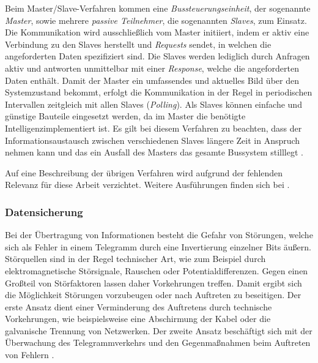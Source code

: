 Beim Master/Slave-Verfahren kommen eine \textit{Bussteuerungseinheit}, der sogenannte \textit{Master}, sowie mehrere \textit{passive Teilnehmer}, die sogenannten \textit{Slaves}, zum Einsatz.
Die Kommunikation wird ausschließlich vom Master initiiert, indem er aktiv eine Verbindung zu den Slaves herstellt und \textit{Requests} sendet, in welchen die angeforderten Daten spezifiziert sind.
Die Slaves werden lediglich durch Anfragen aktiv und antworten unmittelbar mit einer \textit{Response}, welche die angeforderten Daten enthält.
Damit der Master ein umfassendes und aktuelles Bild über den Systemzustand bekommt, erfolgt die Kommunikation in der Regel in periodischen Intervallen zeitgleich mit allen Slaves (\textit{Polling}). Als Slaves können einfache und günstige Bauteile eingesetzt werden, da im Master die benötigte \Gun Intelligenz\Gob implementiert ist. 
Es gilt bei diesem Verfahren zu beachten, dass der Informationsaustausch zwischen verschiedenen Slaves längere Zeit in Anspruch nehmen kann und das ein Ausfall des Masters das gesamte Bussystem stilllegt \cite[S.~19ff.]{schn06}.

Auf eine Beschreibung der übrigen Verfahren wird aufgrund der fehlenden Relevanz für diese Arbeit verzichtet. Weitere Ausführungen finden sich bei \cite{schn06}.

\subsubsection{Datensicherung}

Bei der Übertragung von Informationen besteht die Gefahr von Störungen, welche sich als Fehler in einem Telegramm durch eine Invertierung einzelner Bits äußern. Störquellen sind in der Regel technischer Art, wie zum Beispiel durch elektromagnetische Störsignale, Rauschen oder Potentialdifferenzen. Gegen einen Großteil von Störfaktoren lassen daher Vorkehrungen treffen. Damit ergibt sich die Möglichkeit Störungen vorzubeugen oder nach Auftreten zu beseitigen. Der erste Ansatz dient einer Verminderung des Auftretens durch technische Vorkehrungen, wie beispielsweise eine Abschirmung der Kabel oder die galvanische Trennung von Netzwerken. Der zweite Ansatz beschäftigt sich mit der Überwachung des Telegrammverkehrs und den Gegenmaßnahmen beim Auftreten von Fehlern \cite[S.~30]{schn06}.

